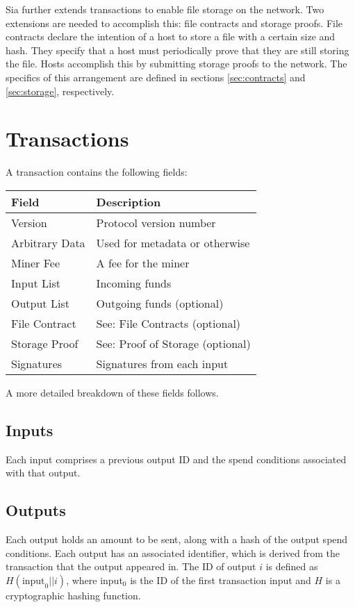 \documentclass[twocolumn]{article}
\begin{document}
Sia further extends transactions to enable file storage on the network.
Two extensions are needed to accomplish this: file contracts and storage proofs.
File contracts declare the intention of a host to store a file with a certain size and hash.
They specify that a host must periodically prove that they are still storing the file.
Hosts accomplish this by submitting storage proofs to the network.
The specifics of this arrangement are defined in sections \ref{sec:contracts} and \ref{sec:storage}, respectively.

\section{Transactions}
A transaction contains the following fields:
\begin{tabular}{| l | l |}
	\hline
	\textbf{Field} & \textbf{Description} \\ \hline
	Version        & Protocol version number \\ \hline
	Arbitrary Data & Used for metadata or otherwise \\ \hline
	Miner Fee      & A fee for the miner \\ \hline
	Input List     & Incoming funds \\ \hline
	Output List    & Outgoing funds (optional) \\ \hline
	File Contract  & See: File Contracts (optional) \\ \hline
	Storage Proof  & See: Proof of Storage (optional) \\ \hline
	Signatures     & Signatures from each input \\ \hline
\end{tabular}

A more detailed breakdown of these fields follows.

\subsection{Inputs}
Each input comprises a previous output ID and the spend conditions associated with that output.

\subsection{Outputs}
Each output holds an amount to be sent, along with a hash of the output spend conditions.
Each output has an associated identifier, which is derived from the transaction that the output appeared in.
The ID of output $i$ is defined as $H(\text{input}_0 || i)$,
where input$_0$ is the ID of the first transaction input and $H$ is a cryptographic hashing function.
\end{document}
